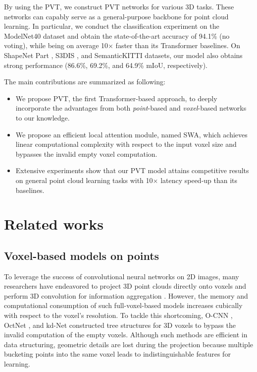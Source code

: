 \documentclass[10pt,twocolumn,letterpaper]{article}
\begin{document}
By using the PVT, we construct PVT networks for various 3D tasks. These networks can capably serve as a general-purpose backbone for point cloud learning. In particular, we conduct the classiﬁcation experiment on the ModelNet40 \cite{modelnet40} dataset and obtain the state-of-the-art accuracy of 94.1\% (no voting), while being on average 10$\times$ faster than its Transformer baselines. On ShapeNet Part \cite{shapenet}, S3DIS \cite{DBLP:journals/corr/ArmeniSZS17}, and SemanticKITTI \cite{semanticKT} datasets, our model also obtains strong performance (86.6\%, 69.2\%, and 64.9\% mIoU, respectively). 

The main contributions are summarized as following:
\begin{itemize}
\item We propose PVT, the first Transformer-based approach, to deeply incorporate the advantages from both \emph{point}-based and \emph{voxel}-based networks to our knowledge.
\item We propose an efficient local attention module, named SWA, which achieves linear computational complexity with respect to the input voxel size and bypasses the invalid empty voxel computation.
\item Extensive experiments show that our PVT model attains competitive results on general point cloud learning tasks with 10$\times$ latency speed-up than its baselines.
\end{itemize}
\section{Related works}

\subsection{Voxel-based models on points}
To leverage the success of convolutional neural networks on 2D images, many researchers have endeavored to project 3D point clouds directly onto voxels and perform 3D convolution for information aggregation \cite{20194D,2018PointGrid}. However, the memory and computational consumption of such full-voxel-based models increases cubically with respect to the voxel's resolution. To tackle this shortcoming, O-CNN \cite{2017O}, OctNet \cite{2016OctNet}, and kd-Net \cite{klokov2017escape} constructed tree structures for 3D voxels to bypass the invalid computation of the empty voxels. Although such methods are efficient in data structuring, geometric details are lost during the projection because multiple bucketing points into the same voxel leads to indistinguishable features for learning.
\end{document}
